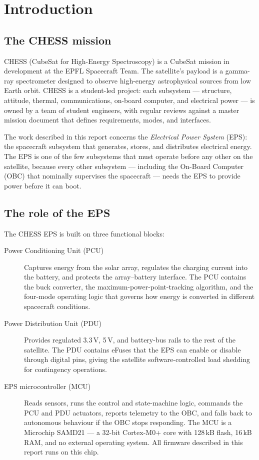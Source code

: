 \section{Introduction}
\label{sec:intro}

\subsection{The CHESS mission}

CHESS (CubeSat for High-Energy Spectroscopy) is a CubeSat mission in
development at the EPFL Spacecraft Team. The satellite's payload is a
gamma-ray spectrometer designed to observe high-energy astrophysical
sources from low Earth orbit. CHESS is a student-led project: each
subsystem --- structure, attitude, thermal, communications, on-board
computer, and electrical power --- is owned by a team of student
engineers, with regular reviews against a master mission document
that defines requirements, modes, and interfaces.

The work described in this report concerns the
\textit{Electrical Power System} (EPS): the spacecraft subsystem that
generates, stores, and distributes electrical energy. The EPS is one
of the few subsystems that must operate before any other on the
satellite, because every other subsystem --- including the On-Board
Computer (OBC) that nominally supervises the spacecraft --- needs the
EPS to provide power before it can boot.

\subsection{The role of the EPS}

The CHESS EPS is built on three functional blocks:

\begin{description}
\item[Power Conditioning Unit (PCU)] Captures energy from the solar
array, regulates the charging current into the battery, and protects
the array--battery interface. The PCU contains the buck converter,
the maximum-power-point-tracking algorithm, and the four-mode
operating logic that governs how energy is converted in different
spacecraft conditions.

\item[Power Distribution Unit (PDU)] Provides regulated 3.3\,V, 5\,V,
and battery-bus rails to the rest of the satellite. The PDU contains
eFuses that the EPS can enable or disable through digital pins,
giving the satellite software-controlled load shedding for
contingency operations.

\item[EPS microcontroller (MCU)] Reads sensors, runs the control and
state-machine logic, commands the PCU and PDU actuators, reports
telemetry to the OBC, and falls back to autonomous behaviour if the
OBC stops responding. The MCU is a Microchip SAMD21 --- a 32-bit
Cortex-M0+ core with 128\,kB flash, 16\,kB RAM, and no external
operating system. All firmware described in this report runs on this
chip.
\end{description}

